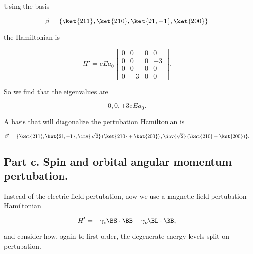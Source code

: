 Using the basis

\begin{equation}\label{eqn:qmTwoExamReflection:n}
\beta = \{ 
\ket{211}, \ket{210}, \ket{21,-1}, \ket{200}
\}
\end{equation}

the Hamiltonian is

\begin{equation}\label{eqn:qmTwoExamReflection:n}
H' = 
e E a_0
\begin{bmatrix}
 0 & 0 & 0 & 0 \\
 0 & 0 & 0 & -3 \\
 0 & 0 & 0 & 0 \\
 0 & -3 & 0 & 0 
\end{bmatrix}.
\end{equation}

So we find that the eigenvalues are

\begin{equation}\label{eqn:qmTwoExamReflection:n}
0, 0, \pm 3 e E a_0.
\end{equation}

A basis that will diagonalize the pertubation Hamiltonian is

\begin{equation}\label{eqn:qmTwoExamReflection:n}
\beta' = \{ 
\ket{211}, \ket{21,-1},
\inv{\sqrt{2}} 
\left(\ket{210}
+\ket{200}
\right),
\inv{\sqrt{2}} 
\left(\ket{210}
-\ket{200}
\right)
\}.
\end{equation}


\subsection{Part c.  Spin and orbital angular momentum pertubation.}

Instead of the electric field pertubation, now we use a magnetic field pertubation Hamiltonian

\begin{equation}\label{eqn:qmTwoExamReflection:n}
H' = 
-\gamma_s \BS \cdot \BB 
-\gamma_o \BL \cdot \BB,
\end{equation}

and consider how, again to first order, the degenerate energy levels split on pertubation.

\EndArticle
